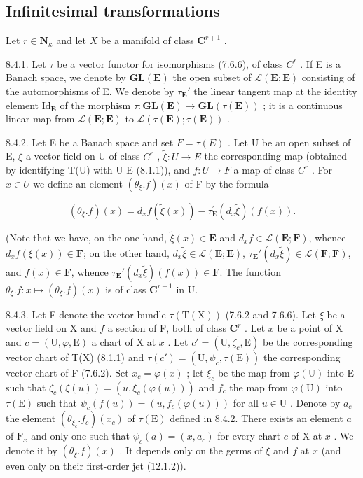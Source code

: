 \subsection{Infinitesimal transformations}

Let \(r \in \mathbf{N}_{\kappa}\) and let \(X\) be a manifold of class \(\mathbf{C}^{r+1}\) .

8.4.1. Let \(\tau\) be a vector functor for isomorphisms (7.6.6), of class \(C^r\) . If E is a Banach space, we denote by \(\mathbf{GL}(\mathbf{E})\) the open subset of \(\mathcal{L}(\mathbf{E};\mathbf{E})\) consisting of the automorphisms of E. We denote by \(\tau_{\mathbf{E}}'\) the linear tangent map at the identity element \(\mathrm{Id}_{\mathbf{E}}\) of the morphism \(\tau\colon\mathbf{GL}(\mathbf{E})\to\mathbf{GL}(\tau(\mathbf{E}))\) ; it is a continuous linear map from \(\mathcal{L}(\mathbf{E};\mathbf{E})\) to \(\mathcal{L}(\tau(\mathbf{E});\tau(\mathbf{E}))\) .

8.4.2. Let E be a Banach space and set \(F = \tau(E)\) . Let U be an open subset of E, \(\xi\) a vector field on U of class \(C^r\) , \(\tilde{\xi} \colon U \to E\) the corresponding map (obtained by identifying T(U) with U \times E (8.1.1)), and \(f \colon U \to F\) a map of class \(C^r\) . For \(x \in U\) we define an element \((\theta_\xi.f)(x)\) of F by the formula

\[
(\theta_ {\xi}. f) (x) = d _ {x} f (\tilde {\xi} (x)) - \tau_ {\mathrm{E}} ^ {\prime} (d _ {x} \tilde {\xi}) (f (x)).\tag{1}
\]

(Note that we have, on the one hand, \(\tilde{\xi}(x) \in \mathbf{E}\) and \(d_x f \in \mathcal{L}(\mathbf{E}; \mathbf{F})\), whence \(d_x f(\xi(x)) \in \mathbf{F}\); on the other hand, \(d_x \tilde{\xi} \in \mathcal{L}(\mathbf{E}; \mathbf{E})\), \(\tau_{\mathbf{E}}'(d_x \tilde{\xi}) \in \mathcal{L}(\mathbf{F}; \mathbf{F})\), and \(f(x) \in \mathbf{F}\), whence \(\tau_{\mathbf{E}}'(d_x \tilde{\xi})(f(x)) \in \mathbf{F}\). The function \(\theta_{\xi}.f: x \mapsto (\theta_{\xi}.f)(x)\) is of class \(\mathbf{C}^{r-1}\) in U.

8.4.3. Let F denote the vector bundle \(\tau(\mathrm{T}(\mathrm{X}))\) (7.6.2 and 7.6.6). Let \(\xi\) be a vector field on X and \(f\) a section of F, both of class \(\mathbf{C}^r\) . Let \(x\) be a point of X and \(c = (\mathrm{U}, \varphi, \mathrm{E})\) a chart of X at \(x\) . Let \(c' = (\mathrm{U}, \zeta_c, \mathrm{E})\) be the corresponding vector chart of T(X) (8.1.1) and \(\tau(c') = (\mathrm{U}, \psi_c, \tau(\mathrm{E}))\) the corresponding vector chart of F (7.6.2). Set \(x_c = \varphi(x)\) ; let \(\xi_c\) be the map from \(\varphi(\mathrm{U})\) into E such that \(\zeta_c(\xi(u)) = (u, \xi_c(\varphi(u)))\) and \(f_c\) the map from \(\varphi(\mathrm{U})\) into \(\tau(\mathrm{E})\) such that \(\psi_c(f(u)) = (u, f_c(\varphi(u)))\) for all \(u \in \mathrm{U}\) . Denote by \(a_c\) the element \((\theta_{\xi_c}.f_c)(x_c)\) of \(\tau(\mathrm{E})\) defined in 8.4.2. There exists an element \(a\) of \(\mathrm{F}_x\) and only one such that \(\psi_c(a) = (x, a_c)\) for every chart \(c\) of X at \(x\) . We denote it by \((\theta_\xi.f)(x)\) . It depends only on the germs of \(\xi\) and \(f\) at \(x\) (and even only on their first-order jet (12.1.2)).

